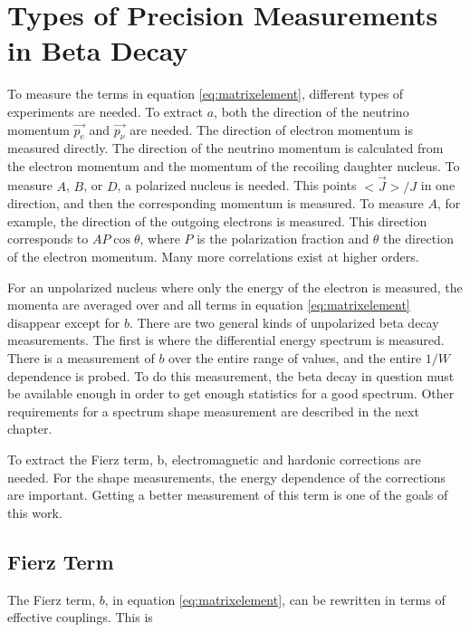 \documentclass[../MaxHughesThesis.tex]{subfiles}
\begin{document}
\section{Types of Precision Measurements in Beta Decay}
To measure the terms in equation \ref{eq:matrixelement}, different types of experiments are needed.
To extract $a$, both the direction of the neutrino momentum $\vec{p_{e}}$ and $\vec{p_{\nu}}$ are needed.  
The direction of electron momentum is measured directly. 
The direction of the neutrino momentum is calculated from the electron momentum and the momentum of the recoiling daughter nucleus. 
To measure $A$, $B$, or $D$, a polarized nucleus is needed.
This points $<\vec{J}>/J$ in one direction, and then the corresponding momentum is measured.
To measure $A$, for example, the direction of the outgoing electrons is measured.
This direction corresponds to $AP\cos{\theta}$, where $P$ is the polarization fraction and $\theta$ the direction of the electron momentum.
Many more correlations exist at higher orders.

For an unpolarized nucleus where only the energy of the electron is measured, the momenta are averaged over and all terms in equation \ref{eq:matrixelement} disappear except for $b$.
There are two general kinds of unpolarized beta decay measurements.
The first is where the differential energy spectrum is measured.
There is a measurement of $b$ over the entire range of values, and the entire $1/W$ dependence is probed.
To do this measurement, the beta decay in question must be available enough in order to get enough statistics for a good spectrum.
Other requirements for a spectrum shape measurement are described in the next chapter.

To extract the Fierz term, b, electromagnetic and hardonic corrections are needed.
For the shape measurements, the energy dependence of the corrections are important.
Getting a better measurement of this term is one of the goals of this work.

\subsection{Fierz Term}
The Fierz term, $b$, in equation \ref{eq:matrixelement}, can be rewritten in terms of effective couplings.
This is %
\end{document}
